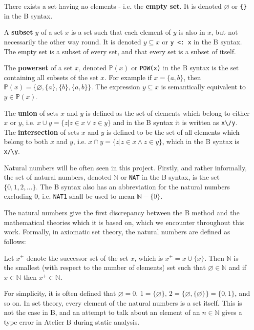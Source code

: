 \documentclass[12pt,journal,duplex]{IEEEtran}
\begin{document}
	There exists a set having no elements - i.e. the \textbf{empty set}. It is denoted $\varnothing$ or \texttt{\{\}} in the B syntax.

	A \textbf{subset} $y$ of a set $x$ is a set such that each element of $y$ is also in $x$, but not necessarily the other way round. It is denoted $y \subseteq x$ or \texttt{y <: x} in the B syntax. The empty set is a subset of every set, and that every set is a subset of itself.

	The \textbf{powerset} of a set $x$, denoted $\mathbb{P}(x)$ or \texttt{POW(x)} in the B syntax is the set containing all subsets of the set $x$. For example if $x = \{a,b\}$, then $\mathbb{P}(x) = \{\varnothing, \{a\}, \{b\}, \{a,b\}\}$. The expression $y \subseteq x$ is semantically equivalent to $y \in \mathbb{P}(x)$.

	The \textbf{union} of sets $x$ and $y$ is defined as the set of elements which belong to either $x$ or $y$, i.e. $x \cup y = \{z| z \in x \vee z \in y\}$ and in the B syntax it is written as \verb|x\/y|. The \textbf{intersection} of sets $x$ and $y$ is defined to be the set of all elements which belong to both $x$ and $y$, i.e. $x \cap y = \{z | z \in x \wedge z \in y \}$, which in the B syntax is \verb|x/\y|.

	Natural numbers will be often seen in this project. Firstly, and rather informally, the set of natural numbers, denoted $\mathbb{N}$ or \texttt{NAT} in the B syntax, is the set $\{0,1,2, ...\}$. The B syntax also has an abbreviation for the natural numbers excluding 0, i.e. \texttt{NAT1} shall be used to mean $\mathbb{N}-\{0\}$.

	The natural numbers give the first discrepancy between the B method and the mathematical theories which it is based on, which we encounter throughout this work. Formally, in axiomatic set theory, the natural numbers are defined as follows:

	Let $x^+$ denote the successor set of the set $x$, which is $x^+ = x \cup \{x\}$. Then $\mathbb{N}$ is the smallest (with respect to the number of elements) set such that $\varnothing \in \mathbb{N}$ and if $x \in \mathbb{N}$ then $x^+ \in \mathbb{N}$.

	For simplicity, it is often defined that $\varnothing = 0$, $1 = \{\varnothing \}$, $2 = \{\varnothing , \{\varnothing\} \} = \{0,1\}$, and so on. In set theory, every element of the natural numbers is a set itself. This is not the case in B, and an attempt to talk about an element of an $n \in \mathbb{N}$ gives a type error in Atelier B during static analysis.
\end{document}
